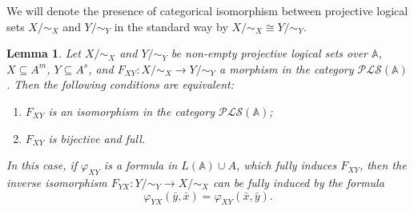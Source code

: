 \documentclass[12pt]{article}
\newtheorem{lemma}{Lemma}
\theoremstyle{definition}
\def\MA{{\mathbb{A}}}
\def\PLS{{\mathcal{PLS}}}
\begin{document}
We will denote the presence of categorical isomorphism between projective logical sets $X/{\sim_X}$ and $Y/{\sim_Y}$ in the standard way by $X/{\sim_X}\cong Y/{\sim_Y}$.

\begin{lemma}\label{le:iso}
Let $X/{\sim_X}$ and $Y/{\sim_Y}$ be non-empty projective logical sets over $\MA$, $X\subseteq A^m$, $Y\subseteq A^s$, and $F_{XY}\colon X/{\sim_X}\to Y/{\sim_Y}$ a morphism in the category $\PLS(\MA)$. Then the following conditions are equivalent:
\begin{enumerate}[label=\arabic*)]
\item\label{le:iso:item1} $F_{XY}$ is an isomorphism in the category $\PLS(\MA)$;
\item\label{le:iso:item2} $F_{XY}$ is bijective and full.
\end{enumerate}
In this case, if $\varphi_{XY}$ is a formula in $L(\MA)\cup A$, which fully induces $F_{XY}$, then  the inverse isomorphism $F_{YX}\colon Y/{\sim_Y}\to X/{\sim_X}$ can be fully induced by the formula 
$$
\varphi_{YX}(\bar y,\bar x)=\varphi_{XY}(\bar x,\bar y).
$$
\end{lemma}
\end{document}
